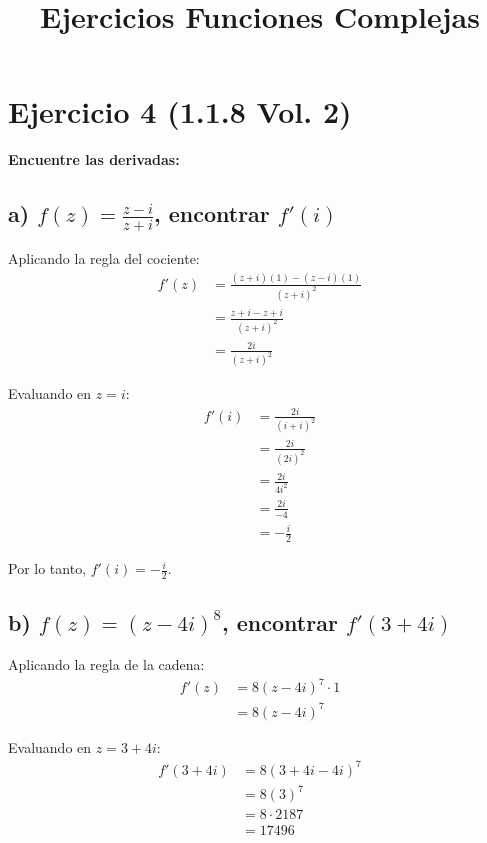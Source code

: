 \documentclass{article}
\title{Ejercicios Funciones Complejas}
\author{}
\date{}
\begin{document}
\maketitle

\section*{Ejercicio 4 (1.1.8 Vol. 2)}

\textbf{Encuentre las derivadas:}

\subsection*{a) $f(z) = \frac{z - i}{z + i}$, encontrar $f'(i)$}

Aplicando la regla del cociente:
\begin{align*}
f'(z) &= \frac{(z + i)(1) - (z - i)(1)}{(z + i)^2} \\
      &= \frac{z + i - z + i}{(z + i)^2} \\
      &= \frac{2i}{(z + i)^2}
\end{align*}

Evaluando en $z = i$:
\begin{align*}
f'(i) &= \frac{2i}{(i + i)^2} \\
      &= \frac{2i}{(2i)^2} \\
      &= \frac{2i}{4i^2} \\
      &= \frac{2i}{-4} \\
      &= -\frac{i}{2}
\end{align*}

Por lo tanto, $f'(i) = -\frac{i}{2}$.

\subsection*{b) $f(z) = (z - 4i)^8$, encontrar $f'(3 + 4i)$}

Aplicando la regla de la cadena:
\begin{align*}
f'(z) &= 8(z - 4i)^7 \cdot 1 \\
      &= 8(z - 4i)^7
\end{align*}

Evaluando en $z = 3 + 4i$:
\begin{align*}
f'(3 + 4i) &= 8(3 + 4i - 4i)^7 \\
           &= 8(3)^7 \\
           &= 8 \cdot 2187 \\
           &= 17496
\end{align*}
\end{document}

